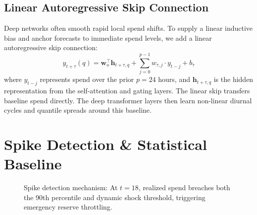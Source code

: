 \documentclass[sigconf]{acmart}
\begin{document}
\subsection{Linear Autoregressive Skip Connection}
Deep networks often smooth rapid local spend shifts. To supply a linear inductive bias and anchor forecasts to immediate spend levels, we add a linear autoregressive skip connection:
\begin{equation}
    \hat{y}_{t+\tau}(q) = \mathbf{w}_o^\top \mathbf{h}_{t+\tau, q} + \sum_{j=0}^{p-1} w_{\tau, j} \cdot y_{t-j} + b_\tau
    \label{eq:ar_skip}
\end{equation}
where $y_{t-j}$ represents spend over the prior $p=24$ hours, and $\mathbf{h}_{t+\tau, q}$ is the hidden representation from the self-attention and gating layers. The linear skip transfers baseline spend directly. The deep transformer layers then learn non-linear diurnal cycles and quantile spreads around this baseline.

\section{Spike Detection \& Statistical Baseline}

\begin{figure}[t]
\centering
{}
\caption{Spike detection mechanism: At $t=18$, realized spend breaches both the 90th percentile and dynamic shock threshold, triggering emergency reserve throttling.}
\label{fig:spike_detection}
\end{figure}
\end{document}
